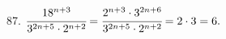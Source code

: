 87. $\cfrac{18^{n+3}}{3^{2n+5}\cdot2^{n+2}}=\cfrac{2^{n+3}\cdot3^{2n+6}}{3^{2n+5}\cdot2^{n+2}}=2\cdot3=6.$\\
